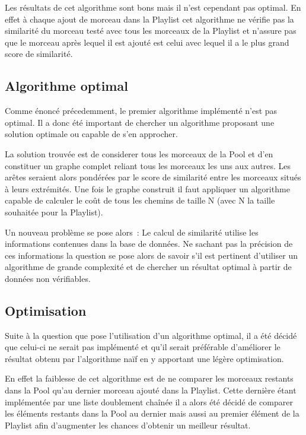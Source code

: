 Les résultats de cet algorithme sont bons mais il n'est cependant pas optimal.
En effet à chaque ajout de morceau dans la Playlist cet algorithme ne vérifie
pas la similarité du morceau testé avec tous les morceaux de la Playlist et
n'assure pas que le morceau après lequel il est ajouté est celui avec lequel
il a le plus grand score de similarité.


\subsection{Algorithme optimal}
\label{impl:selection:optimal}

Comme énoncé précedemment, le premier algorithme implémenté n'est pas optimal.
Il a donc été important de chercher un algorithme proposant une solution
optimale ou capable de s'en approcher.\newline

La solution trouvée est de considerer tous les morceaux de la Pool et d'en
constituer un graphe complet reliant tous les morceaux les uns aux autres. Les
arêtes seraient alors pondérées par le score de similarité entre les morceaux
situés à leurs extrémités. Une fois le graphe construit il faut appliquer un
algorithme capable de calculer le coût de tous les chemins de taille N (avec N
la taille souhaitée pour la Playlist).\newline

Un nouveau problème se pose alors~: Le calcul de similarité utilise les
informations contenues dans la base de données. Ne sachant pas la précision de
ces informations la question se pose alors de savoir s'il est pertinent
d'utiliser un algorithme de grande complexité et de chercher un résultat
optimal à partir de données non vérifiables.

\subsection{Optimisation}
\label{impl:selection:optimisation}

Suite à la question que pose l'utilisation d'un algorithme optimal, il a été
décidé que celui-ci ne serait pas implémenté et qu'il serait préférable
d'améliorer le résultat obtenu par l'algorithme naïf en y apportant une légère
optimisation.\newline

En effet la faiblesse de cet algorithme est de ne comparer les morceaux
restants dans la Pool qu'au dernier morceau ajouté dans la Playlist. Cette
dernière étant implémentée par une liste doublement chaînée il a alors été
décidé de comparer les éléments restants dans la Pool au dernier mais aussi au
premier élément de la Playlist afin d'augmenter les chances d'obtenir un
meilleur résultat.


